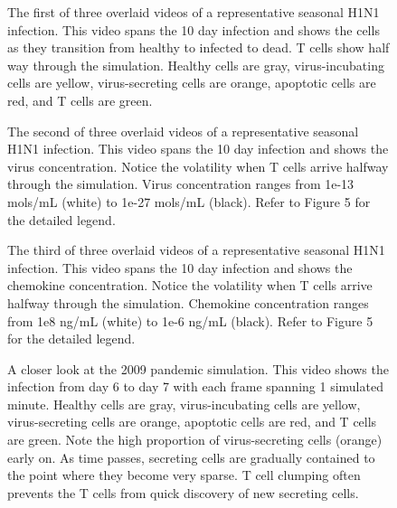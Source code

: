 \documentclass[10pt]{article}
\newcommand{\drew}[1]{{\color{dkgreen}#1}}
\begin{document}

\setcounter{figure}{0}
\renewcommand{\figurename}{Video}


\begin{figure}[ht!]
\caption{The first of three overlaid videos of a representative seasonal H1N1 infection.  This video spans the 10 day infection and shows the cells as they transition from healthy to infected to dead.  T cells show half way through the simulation.  Healthy cells are gray, virus-incubating cells are yellow, virus-secreting cells are orange, apoptotic cells are red, and T cells are green.} 
 \label{video:cell_view}
\end{figure}

\begin{figure}[ht!]
\caption{The second of three overlaid videos of a representative seasonal H1N1 infection.  This video spans the 10 day infection and shows the virus concentration.  Notice the volatility when T cells arrive halfway through the simulation.  Virus concentration ranges from 1e-13 mols/mL (white) to 1e-27 mols/mL (black).  Refer to Figure 5 for the detailed legend. } 
 \label{video:virus_view}
\end{figure}

\begin{figure}[ht!]
\caption{The third of three overlaid videos of a representative seasonal H1N1 infection.  This video spans the 10 day infection and shows the chemokine concentration.  Notice the volatility when T cells arrive halfway through the simulation.  Chemokine concentration ranges from 1e8 ng/mL (white) to 1e-6 ng/mL (black).  Refer to Figure 5 for the detailed legend. } 
 \label{video:chemokine_view}
\end{figure}

\begin{figure}[ht!]
\caption{A closer look at the 2009 pandemic simulation.  This video shows the infection from day 6 to day 7 with each frame spanning 1 simulated minute.  Healthy cells are gray, virus-incubating cells are yellow, virus-secreting cells are orange, apoptotic cells are red, and T cells are green.  Note the high proportion of virus-secreting cells (orange) early on.  As time passes, secreting cells are gradually contained to the point where they become very sparse.  T cell clumping often prevents the T cells from quick discovery of new secreting cells.}
\end{figure}
\end{document}
